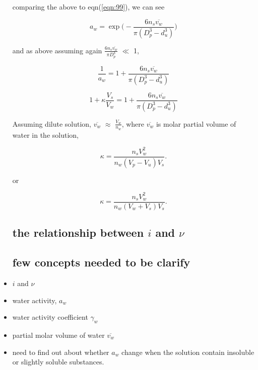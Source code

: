 \documentclass[12pt]{article}
\begin{document}
\begin{itemize}
comparing the above to eqn(\ref{eqn:99}), we can see

\begin{equation}
a_{w}=\exp{\Big(- \frac {6 n_{s} {\overline{v_{w} } } } {\pi (D_{p}^{3}-d_{u}^{3})} \Big)}
\end{equation}

and as above assuming again $\frac{6 n_{s} \overline{v_{w}} } {\pi D_{p}^{3}}$ $\ll$ 1,

\begin{equation}
\frac{1}{a_{w}}=1+\frac{6 n_{s} \overline{v_{w}} } {\pi (D_{p}^{3}-d_{u}^{3})} 
\end{equation}

\begin{equation}\label{eqn:41}
1+\kappa \frac{V_{s}}{V_{w}}=1+\frac{6 n_{s} \overline{v_{w}} } {\pi (D_{p}^{3}-d_{u}^{3})} 
\end{equation}

Assuming dilute solution, $\overline{v_{w}}$ $\approx$ $\frac{V_{w}}{n_{w}}$, where $\overline{v_{w}}$ is molar partial volume of water in the solution, 


\begin{equation}\label{eqn:42}
\kappa=\frac{n_{s}V_{w}^{2}}{n_{w}(V_{p}-V_{u}) V_{s}}.
\end{equation}

or 

\begin{equation}\label{eqn:42}
\kappa=\frac{n_{s}V_{w}^{2}}{n_{w}(V_{w}+V_{s}) V_{s}}.
\end{equation}



\subsection{the relationship between $i$ and $\nu$}

\subsection{few concepts needed to be clarify}


\item $i$ and $\nu$
\item water activity, $a_{w}$
\item water activity coefficient $\gamma_{w}$
\item partial molar volume of water $\overline{v_{w}}$
\item need to find out about whether $a_{w}$ change when the solution contain insoluble or slightly soluble substances.

\end{itemize}
\end{document}
